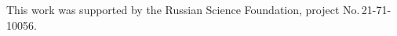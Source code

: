 









\Ack


\noindent


This work was supported by the Russian Science Foundation, project No.\,21-71-10056.


  










